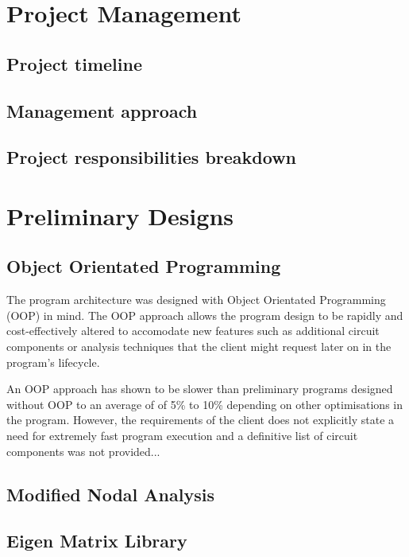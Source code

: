 \documentclass[12pt,a4paper]{article}
\begin{document}
\section{Project Management}
\pagebreak

	\subsection{Project timeline}

	\pagebreak

	\subsection{Management approach}
	\pagebreak

	\subsection{Project responsibilities breakdown}
	\pagebreak

\section{Preliminary Designs}
	\subsection{Object Orientated Programming}
	The program architecture was designed with Object Orientated Programming (OOP) in mind. 
	The OOP approach allows the program design to be rapidly and cost-effectively altered to accomodate new features
	such as additional circuit components or analysis techniques that the client might request later on in the 
	program's lifecycle. 

	An OOP approach has shown to be slower than preliminary programs designed without OOP to an average of of 5\% to 10\% 
	depending on other optimisations in the program. However, the requirements of the client does not 
	explicitly state a need for extremely fast program execution and a definitive list of circuit components was not
	provided...

	\subsection{Modified Nodal Analysis}

	\subsection{Eigen Matrix Library}
	\pagebreak
\end{document}
